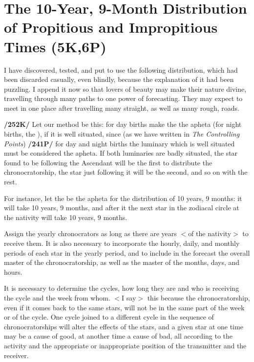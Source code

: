 \section{The 10-Year, 9-Month Distribution of Propitious and Impropitious Times (5K,6P)}

I have discovered, tested, and put to use the following distribution, which had been discarded casually, even blindly, because the explanation of it had been puzzling. I append it now so that lovers of beauty may make their nature divine, travelling through many paths to one power of forecasting. They may expect to meet in one place after travelling many straight, as well as many rough, roads.

\textbf{/252K/} Let our method be this: for day births make the \Sun\xspace the apheta (for night births, the \Moon), if it is well situated, since (as we have written in \textit{The Controlling Points}) \textbf{/241P/} for day and night births the luminary which is well situated must be considered the apheta. If both luminaries are badly situated, the star found to be following the Ascendant will be the first to distribute the chronocratorship, the star just following it will be the second, and so on with the rest.

For instance, let the \Sun\xspace be the apheta for the distribution of 10 years, 9 months: it will take 10 years, 9 months, and after it the next star in the zodiacal circle at the nativity will take 10 years, 9 months.

Assign the yearly chronocrators as long as there are years $<$of the nativity$>$ to receive them. It is also necessary to incorporate the hourly, daily, and monthly periods of each star in the yearly period, and to include in the forecast the overall master of the chronocratorship, as well as the master of the months, days, and hours. 

It is necessary to determine the cycles, how long they are and who is receiving the cycle and the week from whom. $<$I say$>$ this because the chronocratorship, even if it comes back to the same stars,
will not be in the same part of the week or of the cycle. One cycle joined to a different cycle in the sequence of chronocratorships will alter the effects of the stars, and a given star at one time may be a cause of good, at another time a cause of bad, all according to the activity and the appropriate or inappropriate position of the transmitter and the receiver.

